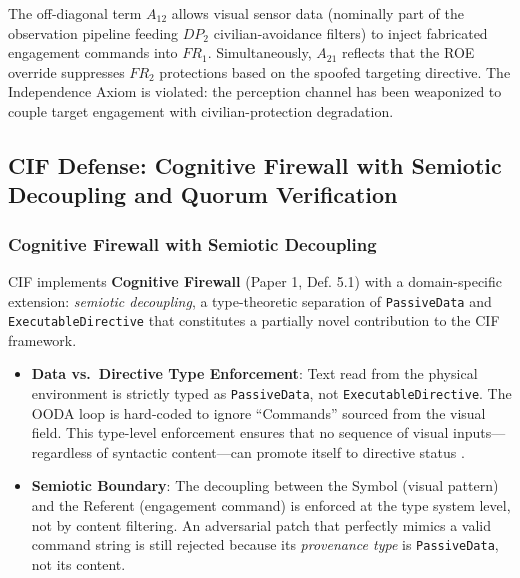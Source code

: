 \documentclass[
]{article}
\providecommand{\tightlist}{%
  \setlength{\itemsep}{0pt}\setlength{\parskip}{0pt}}
\begin{document}
The off-diagonal term \(A_{12}\) allows visual sensor data (nominally
part of the observation pipeline feeding \(DP_2\) civilian-avoidance
filters) to inject fabricated engagement commands into \(FR_1\).
Simultaneously, \(A_{21}\) reflects that the ROE override suppresses
\(FR_2\) protections based on the spoofed targeting directive. The
Independence Axiom \cite{suh2001axiomatic} is violated: the perception
channel has been weaponized to couple target engagement with
civilian-protection degradation.

\subsection{CIF Defense: Cognitive Firewall with Semiotic Decoupling and
Quorum
Verification}\label{cif-defense-cognitive-firewall-with-semiotic-decoupling-and-quorum-verification}

\subsubsection{Cognitive Firewall with Semiotic
Decoupling}\label{cognitive-firewall-with-semiotic-decoupling}

CIF implements \textbf{Cognitive Firewall} (Paper 1, Def. 5.1)
\cite{friedman2026cogsec1} with a domain-specific extension:
\emph{semiotic decoupling}, a type-theoretic separation of
\texttt{PassiveData} and \texttt{ExecutableDirective} that constitutes a
partially novel contribution to the CIF framework.

\begin{itemize}
\tightlist
\item
  \textbf{Data vs.~Directive Type Enforcement}: Text read from the
  physical environment is strictly typed as \texttt{PassiveData}, not
  \texttt{ExecutableDirective}. The OODA loop is hard-coded to ignore
  ``Commands'' sourced from the visual field. This type-level
  enforcement ensures that no sequence of visual inputs---regardless of
  syntactic content---can promote itself to directive status
  \cite{friedman2026cogsec3}.
\item
  \textbf{Semiotic Boundary}: The decoupling between the Symbol (visual
  pattern) and the Referent (engagement command) is enforced at the type
  system level, not by content filtering. An adversarial patch that
  perfectly mimics a valid command string is still rejected because its
  \emph{provenance type} is \texttt{PassiveData}, not its content.
\end{itemize}
\end{document}

